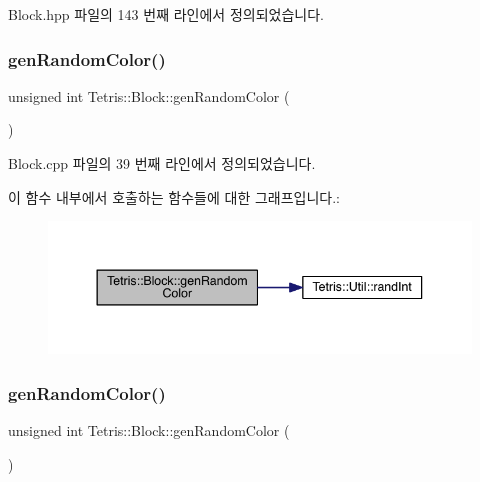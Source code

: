Block.\+hpp 파일의 143 번째 라인에서 정의되었습니다.

\mbox{\label{class_tetris_1_1_block_a4bae85cab786853cb3ff76aa7fe72edc}} 
\subsubsection{\texorpdfstring{gen\+Random\+Color()}{genRandomColor()}\hspace{0.1cm}{\footnotesize\ttfamily [1/2]}}
{\footnotesize\ttfamily unsigned int Tetris\+::\+Block\+::gen\+Random\+Color (\begin{DoxyParamCaption}{ }\end{DoxyParamCaption})}



Block.\+cpp 파일의 39 번째 라인에서 정의되었습니다.

이 함수 내부에서 호출하는 함수들에 대한 그래프입니다.\+:
\nopagebreak
\begin{figure}[H]
\begin{center}
\leavevmode
\includegraphics[width=344pt]{class_tetris_1_1_block_a4bae85cab786853cb3ff76aa7fe72edc_cgraph}
\end{center}
\end{figure}
\mbox{\label{class_tetris_1_1_block_a4bae85cab786853cb3ff76aa7fe72edc}} 
\subsubsection{\texorpdfstring{gen\+Random\+Color()}{genRandomColor()}\hspace{0.1cm}{\footnotesize\ttfamily [2/2]}}
{\footnotesize\ttfamily unsigned int Tetris\+::\+Block\+::gen\+Random\+Color (\begin{DoxyParamCaption}{ }\end{DoxyParamCaption})\hspace{0.3cm}{\ttfamily [inline]}}

